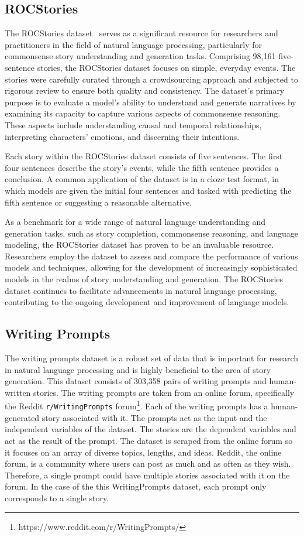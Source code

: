 \documentclass[letterpaper]{article}
\begin{document}
\subsection{ROCStories}
The ROCStories dataset~\cite{mostafazadeh2016corpus} serves as a significant resource for researchers and practitioners in the field of natural language processing, particularly for commonsense story understanding and generation tasks. Comprising 98,161 five-sentence stories, the ROCStories dataset focuses on simple, everyday events. The stories were carefully curated through a crowdsourcing approach and subjected to rigorous review to ensure both quality and consistency. The dataset's primary purpose is to evaluate a model's ability to understand and generate narratives by examining its capacity to capture various aspects of commonsense reasoning. These aspects include understanding causal and temporal relationships, interpreting characters' emotions, and discerning their intentions.

Each story within the ROCStories dataset consists of five sentences. The first four sentences describe the story's events, while the fifth sentence provides a conclusion. A common application of the dataset is in a cloze test format, in which models are given the initial four sentences and tasked with predicting the fifth sentence or suggesting a reasonable alternative.

As a benchmark for a wide range of natural language understanding and generation tasks, such as story completion, commonsense reasoning, and language modeling, the ROCStories dataset has proven to be an invaluable resource. Researchers employ the dataset to assess and compare the performance of various models and techniques, allowing for the development of increasingly sophisticated models in the realms of story understanding and generation. The ROCStories dataset continues to facilitate advancements in natural language processing, contributing to the ongoing development and improvement of language models.
\subsection{Writing Prompts}

The writing prompts dataset is a robust set of data that is important for research in natural language processing and is highly beneficial to the area of story generation. This dataset consists of 303,358 pairs of writing prompts and human-written stories. The writing prompts are taken from an online forum, specifically the Reddit  \texttt{r/WritingPrompts} forum\footnote{https://www.reddit.com/r/WritingPrompts/}. Each of the writing prompts has a human-generated story associated with it. The prompts act as the input and the independent variables of the dataset. The stories are the dependent variables and act as the result of the prompt. The dataset is scraped from the online forum so it focuses on an array of diverse topics, lengths, and ideas. Reddit, the online forum, is a community where users can post as much and as often as they wish. Therefore, a single prompt could have multiple stories associated with it on the forum. In the case of the this WritingPrompts dataset, each prompt only corresponds to a single story.
\end{document}
